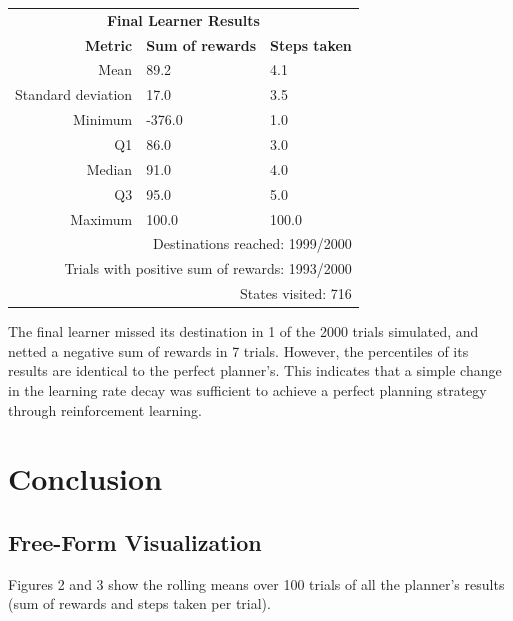 \documentclass{article}
\begin{document}
\begin{center}
   \begin{tabular}{rll}
        \multicolumn{3}{c}{\textbf{Final Learner Results}} \\
        \textbf{Metric}     & \textbf{Sum of rewards}   & \textbf{Steps taken}\\
        Mean                & 89.2                      & 4.1\\
        Standard deviation  & 17.0                      & 3.5\\
        Minimum             & -376.0                    & 1.0\\
        Q1                  & 86.0                      & 3.0\\
        Median              & 91.0                      & 4.0\\
        Q3                  & 95.0                      & 5.0\\
        Maximum             & 100.0                     & 100.0\\
        \multicolumn{3}{r}{Destinations reached: 1999/2000}\\
        \multicolumn{3}{r}{Trials with positive sum of rewards: 1993/2000}\\
        \multicolumn{3}{r}{States visited: 716}\\
    \end{tabular}
\end{center}

The final learner missed its destination in 1 of the 2000 trials simulated, and netted a negative sum of rewards in 7 trials. However, the percentiles of its results are identical to the perfect planner's. This indicates that a simple change in the learning rate decay was sufficient to achieve a perfect planning strategy through reinforcement learning. 

\section{Conclusion}

\subsection{Free-Form Visualization}
Figures 2 and 3 show the rolling means over 100 trials of all the planner's results (sum of rewards and steps taken per trial).
\end{document}
